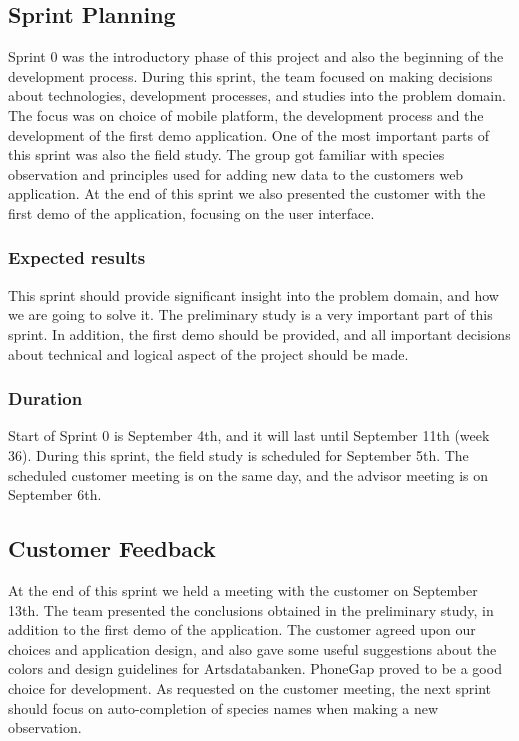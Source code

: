 \subsection{Sprint Planning}
	Sprint 0 was the introductory phase of this project and also the beginning of the development process. During this sprint, the team focused on making decisions about technologies, development processes, and studies into the problem domain. The focus was on choice of mobile platform, the development process and the development of the first demo application. One of the most important parts of this sprint was also the field study. The group got familiar with species observation and principles used for adding new data to the customers web application.\newline
  At the end of this sprint we also presented the customer with the first demo of the application, focusing on the user interface.
	
	\subsubsection{Expected results}
	This sprint should provide significant insight into the problem domain, and how we are going to solve it. The preliminary study is a very important part of this sprint. In addition, the first demo should be provided, and all important decisions about technical and logical aspect of the project should be made.
	
	\subsubsection{Duration}
	Start of Sprint 0 is September 4th, and it will last until September 11th (week 36). During this sprint, the field study is scheduled for September 5th. The scheduled customer meeting is on the same day, and the advisor meeting is on September 6th.
	
	
	
\subsection{Customer Feedback}
	At the end of this sprint we held a meeting with the customer on September 13th. The team presented the conclusions obtained in the preliminary study, in addition to the first demo of the application. The customer agreed upon our choices and application design, and also gave some useful suggestions about the colors and design guidelines for Artsdatabanken. PhoneGap proved to be a good choice for development.
As requested on the customer meeting, the next sprint should focus on auto-completion of species names when making a new observation.
	
